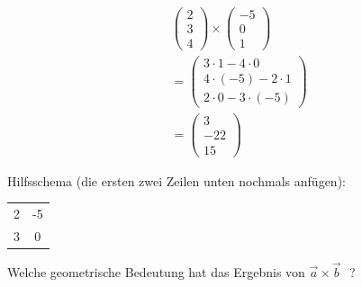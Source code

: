 \documentclass[paper=a6,landscape,ngerman,twoside=true,fontsize=12pt]{scrartcl}
\begin{document}
\begin{antwort}
	
	\begin{align*}
	&\left(\begin{array}{c} 2 \\ 3 \\ 4\end{array} \right) \times \left(\begin{array}{c} -5 \\ 0 \\ 1\end{array} \right) \\
	&= \left(\begin{array}{c} 3 \cdot 1 - 4 \cdot 0 \\ 4 \cdot (-5) - 2 \cdot 1 \\ 2 \cdot 0 - 3 \cdot (-5)\end{array} \right)\\
	&=\left(\begin{array}{c} 3 \\ -22 \\ 15\end{array} \right)
	\end{align*}
	
	Hilfsschema (die ersten zwei Zeilen unten nochmals anfügen):
	\begin{center}
	\begin{tabular}{cc}
	2 & -5 \\
	3 & 0
	\end{tabular}
	\end{center}
		
\end{antwort}	
\begin{frage}
	
	Welche geometrische Bedeutung hat das Ergebnis von $\vec{a}\times\vec{b}\textbf{ }$?
	
\end{frage}
\end{document}
